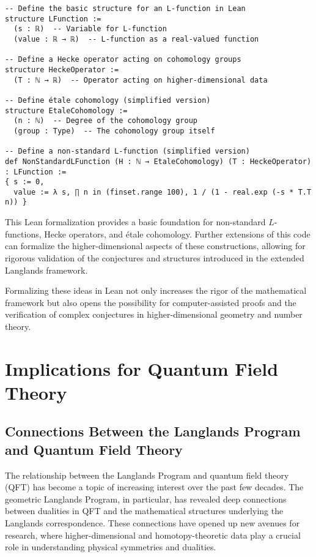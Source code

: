 \documentclass{article}
\theoremstyle{remark}
\begin{document}
\begin{lstlisting}
-- Define the basic structure for an L-function in Lean
structure LFunction :=
  (s : ℝ)  -- Variable for L-function
  (value : ℝ → ℝ)  -- L-function as a real-valued function

-- Define a Hecke operator acting on cohomology groups
structure HeckeOperator :=
  (T : ℕ → ℝ)  -- Operator acting on higher-dimensional data

-- Define étale cohomology (simplified version)
structure EtaleCohomology :=
  (n : ℕ)  -- Degree of the cohomology group
  (group : Type)  -- The cohomology group itself

-- Define a non-standard L-function (simplified version)
def NonStandardLFunction (H : ℕ → EtaleCohomology) (T : HeckeOperator) : LFunction :=
{ s := 0,
  value := λ s, ∏ n in (finset.range 100), 1 / (1 - real.exp (-s * T.T n)) }
\end{lstlisting}

This Lean formalization provides a basic foundation for non-standard $L$-functions, Hecke operators, and étale cohomology. Further extensions of this code can formalize the higher-dimensional aspects of these constructions, allowing for rigorous validation of the conjectures and structures introduced in the extended Langlands framework.

Formalizing these ideas in Lean not only increases the rigor of the mathematical framework but also opens the possibility for computer-assisted proofs and the verification of complex conjectures in higher-dimensional geometry and number theory.



\section{Implications for Quantum Field Theory}

\subsection{Connections Between the Langlands Program and Quantum Field Theory}

The relationship between the Langlands Program and quantum field theory (QFT) has become a topic of increasing interest over the past few decades. The geometric Langlands Program, in particular, has revealed deep connections between dualities in QFT and the mathematical structures underlying the Langlands correspondence. These connections have opened up new avenues for research, where higher-dimensional and homotopy-theoretic data play a crucial role in understanding physical symmetries and dualities.
\end{document}
